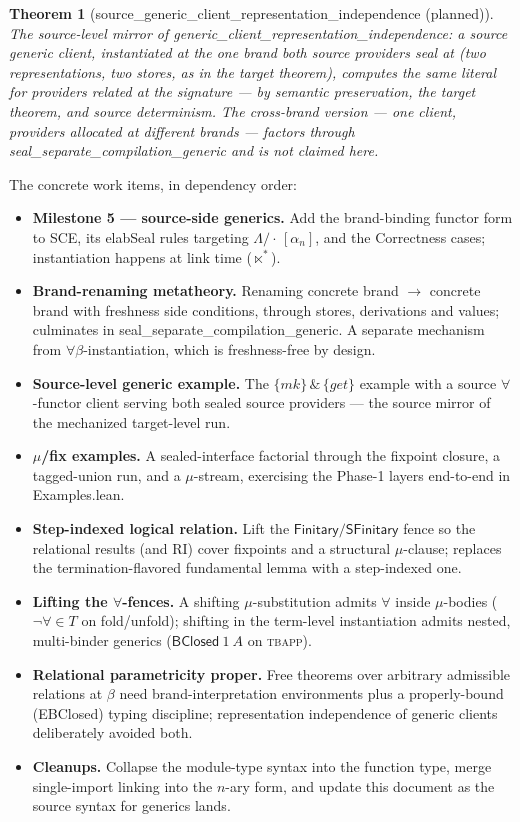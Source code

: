 \documentclass[10pt]{article}
\newtheorem{plannedx}[theorem]{Theorem}
\newenvironment{planned}[1]{\begin{plannedx}[{\color{red}\textsf{#1} \textnormal{(planned)}}]\color{red}}{\end{plannedx}}
\newcommand{\bra}[1]{\alpha_{#1}}
\newcommand{\bapp}[2]{#1\,[\bra{#2}]}
\newcommand{\hallb}[1]{\forall\!\in\!#1}
\newcommand{\bcl}[2]{\mathsf{BClosed}\ #1\ #2}
\begin{document}
\begin{planned}{source\_\allowbreak generic\_\allowbreak client\_\allowbreak representation\_\allowbreak independence}
The source-level mirror of
\textsf{generic\_\allowbreak client\_\allowbreak representation\_\allowbreak independence}: a source generic client,
instantiated at the one brand both source providers seal at (two representations, two
stores, as in the target theorem), computes the same literal for providers related at
the signature — by semantic preservation, the target theorem, and source determinism.
The cross-brand version — one client, providers allocated at \emph{different} brands —
factors through \textsf{seal\_\allowbreak separate\_\allowbreak compilation\_\allowbreak generic} and is not claimed here.
\end{planned}

\medskip
\noindent The concrete work items, in dependency order:
\begin{itemize}
\item \textbf{Milestone 5 — source-side generics.}  Add the brand-binding functor form to
  SCE, its \textsf{elabSeal} rules targeting $\Lambda/\bapp{\cdot}{n}$, and the
  Correctness cases; instantiation happens at link time ($\ltimes^{\!*}$).
\item \textbf{Brand-renaming metatheory.}  Renaming concrete brand $\to$ concrete brand
  with freshness side conditions, through stores, derivations and values; culminates in
  \textsf{seal\_separate\_compilation\_generic}.  A separate mechanism from
  $\forall\beta$-instantiation, which is freshness-free by design.
\item \textbf{Source-level generic example.}  The $\{mk\} \,\&\, \{get\}$ example with a
  source $\forall$-functor client serving both sealed source providers — the source
  mirror of the mechanized target-level run.
\item \textbf{$\mu$/fix examples.}  A sealed-interface factorial through the fixpoint
  closure, a tagged-union run, and a $\mu$-stream, exercising the Phase-1 layers
  end-to-end in \textsf{Examples.lean}.
\item \textbf{Step-indexed logical relation.}  Lift the
  $\mathsf{Finitary}/\mathsf{SFinitary}$ fence so the relational results (and RI) cover
  fixpoints and a structural $\mu$-clause; replaces the termination-flavored
  fundamental lemma with a step-indexed one.
\item \textbf{Lifting the $\forall$-fences.}  A shifting $\mu$-substitution admits
  $\forall$ inside $\mu$-bodies ($\neg\hallb{T}$ on fold/unfold); shifting in the
  term-level instantiation admits nested, multi-binder generics ($\bcl{1}{A}$ on
  \textsc{tbapp}).
\item \textbf{Relational parametricity proper.}  Free theorems over arbitrary
  admissible relations at $\beta$ need brand-interpretation environments plus a
  properly-bound (EBClosed) typing discipline; representation independence of generic
  clients deliberately avoided both.
\item \textbf{Cleanups.}  Collapse the module-type syntax into the function type,
  merge single-import linking into the $n$-ary form, and update this document as the
  source syntax for generics lands.
\end{itemize}
\end{document}
